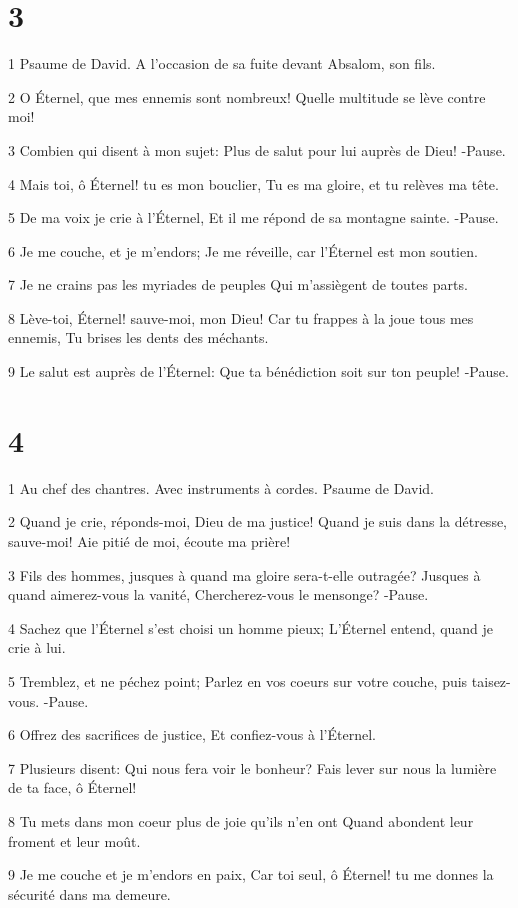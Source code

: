 \chapter{3}

\par 1 Psaume de David. A l'occasion de sa fuite devant Absalom, son fils.
\par 2 O Éternel, que mes ennemis sont nombreux! Quelle multitude se lève contre moi!
\par 3 Combien qui disent à mon sujet: Plus de salut pour lui auprès de Dieu! -Pause.
\par 4 Mais toi, ô Éternel! tu es mon bouclier, Tu es ma gloire, et tu relèves ma tête.
\par 5 De ma voix je crie à l'Éternel, Et il me répond de sa montagne sainte. -Pause.
\par 6 Je me couche, et je m'endors; Je me réveille, car l'Éternel est mon soutien.
\par 7 Je ne crains pas les myriades de peuples Qui m'assiègent de toutes parts.
\par 8 Lève-toi, Éternel! sauve-moi, mon Dieu! Car tu frappes à la joue tous mes ennemis, Tu brises les dents des méchants.
\par 9 Le salut est auprès de l'Éternel: Que ta bénédiction soit sur ton peuple! -Pause.

\chapter{4}

\par 1 Au chef des chantres. Avec instruments à cordes. Psaume de David.
\par 2 Quand je crie, réponds-moi, Dieu de ma justice! Quand je suis dans la détresse, sauve-moi! Aie pitié de moi, écoute ma prière!
\par 3 Fils des hommes, jusques à quand ma gloire sera-t-elle outragée? Jusques à quand aimerez-vous la vanité, Chercherez-vous le mensonge? -Pause.
\par 4 Sachez que l'Éternel s'est choisi un homme pieux; L'Éternel entend, quand je crie à lui.
\par 5 Tremblez, et ne péchez point; Parlez en vos coeurs sur votre couche, puis taisez-vous. -Pause.
\par 6 Offrez des sacrifices de justice, Et confiez-vous à l'Éternel.
\par 7 Plusieurs disent: Qui nous fera voir le bonheur? Fais lever sur nous la lumière de ta face, ô Éternel!
\par 8 Tu mets dans mon coeur plus de joie qu'ils n'en ont Quand abondent leur froment et leur moût.
\par 9 Je me couche et je m'endors en paix, Car toi seul, ô Éternel! tu me donnes la sécurité dans ma demeure.

